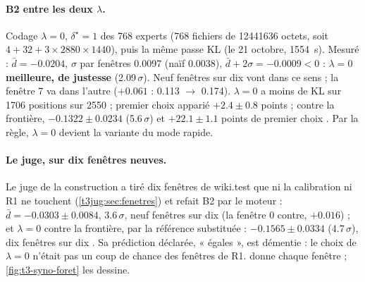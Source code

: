 \paragraph{B2 entre les deux $\lambda$.} Codage $\lambda = 0$, $\delta^\star = 1$ des 768 experts (768 fichiers de \num{12441636} octets, soit $4 + 32 + 3 \times \num{2880} \times \num{1440}$), puis la même passe KL (le 21 octobre, \SI{1554}{\second}). Mesuré : $\bar d = -\num{0.0204}$, $\sigma$ par fenêtres \num{0.0097} (naïf \num{0.0038}), $\bar d + 2\sigma = -\num{0.0009} < 0$ : $\lambda = 0$ \textbf{meilleure, de justesse} (\num{2.09}\,$\sigma$). Neuf fenêtres sur dix vont dans ce sens ; la fenêtre 7 va dans l'autre ($+\num{0.061}$ : \num{0.113} $\to$ \num{0.174}). $\lambda = 0$ a moins de KL sur \num{1706} positions sur \num{2550} ; premier choix apparié $+\num{2.4} \pm \num{0.8}$ points ; contre la frontière, $-\num{0.1322} \pm \num{0.0234}$ (\num{5.6}\,$\sigma$) et $+\num{22.1} \pm \num{1.1}$ points de premier choix \mes. Par la règle, $\lambda = 0$ devient la variante du mode rapide.

\paragraph{Le juge, sur dix fenêtres neuves.} Le juge de la construction a tiré dix fenêtres de wiki.test que ni la calibration ni R1 ne touchent (\cref{t3jug:sec:fenetres}) et refait B2 par le moteur : $\bar d = -\num{0.0303} \pm \num{0.0084}$, \num{3.6}\,$\sigma$, neuf fenêtres sur dix (la fenêtre 0 contre, $+\num{0.016}$) ; et $\lambda = 0$ contre la frontière, par la référence substituée : $-\num{0.1565} \pm \num{0.0334}$ (\num{4.7}\,$\sigma$), dix fenêtres sur dix \mes. Sa prédiction déclarée, « égales », est démentie : le choix de $\lambda = 0$ n'était pas un coup de chance des fenêtres de R1.  donne chaque fenêtre ; \cref{fig:t3-syno-foret} les dessine.

